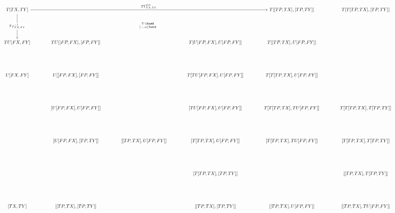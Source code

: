 \documentclass[12pt,dvipsnames,oneside]{amsart}
\theoremstyle{plain}
\theoremstyle{remark}
\theoremstyle{definition}
\newenvironment{amssidewaysfigure}{%
  \begin{landscape}
    \thispagestyle{empty}
    \begin{figure}[htbp]
}{%
    \end{figure}
  \end{landscape}
}
\newcommand{\mathscale}[2]{\scalebox{#1}{\mbox{\ensuremath{\displaystyle #2}}}}
\newcommand*{\blank}{{-}}
\newcommand*{\bblank}{{=}}
\newcommand{\free}{F}
\newcommand{\forget}{U}
\begin{document}
\printbibliography

\clearpage

\pagestyle{empty}

\appendix


\begin{amssidewaysfigure}\vspace{1cm}
    \[\hspace{-2.5cm}\mathscale{0.65}{
        \begin{tikzcd}[ampersand replacement=\&,column sep=large,row sep=large]
        {T[TX,TY]} \&\&\&\& {T[[TP,TX],[TP,TY]]} \& {T[T[TP,TX],[TP,TY]]} \\
        \\
        {T\forget[\free X,\free Y]} \& {T\forget[[\free P,\free X],[\free P,\free Y]]} \&\& {T[\forget[\free P,\free X],\forget[\free P,\free Y]]} \& {T[[TP,TX],\forget[\free P,\free Y]]} \\
        \\
        {\forget[\free X,\free Y]} \& {\forget[[\free P,\free X],[\free P,\free Y]]} \&\& {T[T\forget[\free P,\free X],\forget[\free P,\free Y]]} \& {T[T[TP,TX],\forget[\free P,\free Y]]} \\
        \\
        \& {[\forget[\free P,\free X],\forget[\free P,\free Y]]} \&\& {[T\forget[\free P,\free X],\forget[\free P,\free Y]]} \& {T[T[TP,TX],T\forget[\free P,\free Y]]} \& {T[T[TP,TX],T[TP,TY]]} \\
        \\
        \& {[\forget[\free P,\free X],[TP,TY]]} \& {[[TP,TX],\forget[\free P,\free Y]]} \& {[T[TP,TX],\forget[\free P,\free Y]]} \& {[T[TP,TX],T\forget[\free P,\free Y]]} \& {[T[TP,TX],T[TP,TY]]} \\
        \\
        \&\&\& {[T[TP,TX],[TP,TY]]} \&\& {[[TP,TX],T[TP,TY]]} \\
        \\
        {[TX,TY]} \& {[[TP,TX],[TP,TY]]} \&\& {[[TP,TX],[TP,TY]]} \& {[[TP,TX],\forget[\free P,\free Y]]} \& {[[TP,TX],T\forget[\free P,\free Y]]}
        \arrow["{{{{{T\Gamma_{TX,TY}^{TP}}}}}}", from=1-1, to=1-5]
        \arrow["{{{{{T\varphi^{-1}_{\free X,\free Y}}}}}}"{description}, from=1-1, to=3-1]
        \arrow["\begin{array}{c} \substack{\forget \, \mathsf{closed} \\[1pt] [\blank,\bblank] \, \mathsf{funct}} \end{array}"{description}, draw=none, from=1-1, to=3-5]

\end{tikzcd}}\]
\end{amssidewaysfigure}
\end{document}
